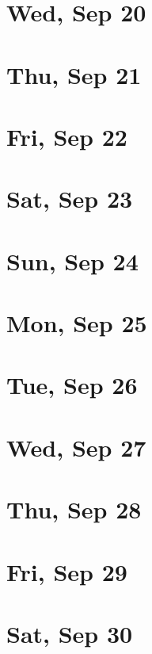 	\section{Wed, Sep 20}
		
	\section{Thu, Sep 21}
		
	\section{Fri, Sep 22}
		
	\section{Sat, Sep 23}
		
	\section{Sun, Sep 24}
		
	\section{Mon, Sep 25}
		
	\section{Tue, Sep 26}
		
	\section{Wed, Sep 27}
		
	\section{Thu, Sep 28}
		
	\section{Fri, Sep 29}
		
	\section{Sat, Sep 30}
		
